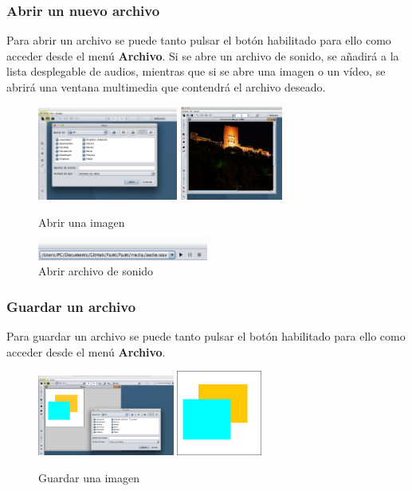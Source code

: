 \subsubsection{Abrir un nuevo archivo}
Para abrir un archivo se puede tanto pulsar el botón habilitado para ello como acceder desde el menú \textbf{Archivo}. Si se abre un archivo de sonido, se añadirá a la lista desplegable de audios, mientras que si se abre una imagen o un vídeo, se abrirá una ventana multimedia que contendrá el archivo deseado.
\vskip0.3cm
\begin{figure}[H]
 \centering
  \includegraphics[width=0.41\textwidth]{generales/abrirImagen1.png}
  \includegraphics[width=0.3\textwidth]{generales/abrirImagen2.png}
 \caption{Abrir una imagen}
 \label{diseño}
 \end{figure}
 \vskip0.3cm
\begin{figure}[H]
 \centering
  \includegraphics[width=0.5\textwidth]{sonido/archivoAbierto.png}
 \caption{Abrir archivo de sonido}
 \label{diseño}
 \end{figure}
\subsubsection{Guardar un archivo}
Para guardar un archivo se puede tanto pulsar el botón habilitado para ello como acceder desde el menú \textbf{Archivo}.
\vskip0.3cm
\begin{figure}[H]
 \centering
  \includegraphics[width=0.4\textwidth]{generales/guardar.png}
  \includegraphics[width=0.25\textwidth]{generales/prueba.png}
 \caption{Guardar una imagen}
 \label{diseño}
 \end{figure}
